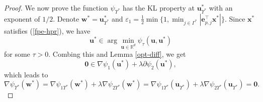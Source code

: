 \documentclass{article}
\numberwithin{equation}{section}
\begin{document}
\begin{proof}
We now prove the function $\psi_{\Upsilon^*}$ has the KL property at $\mathbf{u}_{\Upsilon^*}^*$ with an exponent of $1/2$. Denote  $\mathbf{w}^*=\mathbf{u}_{\Upsilon^*}^*$ and $\varepsilon_1=\frac{1}{2}\min\{1, \min_{j\in\Gamma^*}|\mathbf{e}_{p,j}^\top\mathbf{x}^*|\}$.
Since $\mathbf{x}^*$ satisfies (\ref{fpe-hpr}), we have
$$\mathbf{u}^*\in\arg\min_{\mathbf{u}\in\mathbb{R}^d}\psi_\tau(\mathbf{u}, \mathbf{u}^*)$$ for some $\tau>0$.
Combing this and Lemma \ref{opt-diff}, we get
$$\mathbf{0}\in\nabla\psi_1(\mathbf{u}^*)+\lambda\partial\psi_2(\mathbf{u}^*),$$
which leads to
\begin{equation}\label{psi-res-0}\nabla\psi_{\Upsilon^*}(\mathbf{w}^*)=\nabla\psi_{1\Upsilon^*}(\mathbf{w}^*)+\lambda\nabla\psi_{2\Upsilon^*}(\mathbf{w}^*)=
	\nabla\psi_{1\Upsilon^*}(\mathbf{u}_{\Upsilon^*})+\lambda\nabla\psi_{2\Upsilon^*}(\mathbf{u}_{\Upsilon^*})=\mathbf{0}.\end{equation}



\end{proof}
\end{document}
